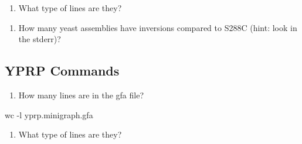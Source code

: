 \documentclass[
]{book}
\newenvironment{Shaded}{\begin{snugshade}}{\end{snugshade}}
\newcommand{\AttributeTok}[1]{\textcolor[rgb]{0.77,0.63,0.00}{#1}}
\newcommand{\FunctionTok}[1]{\textcolor[rgb]{0.00,0.00,0.00}{#1}}
\newcommand{\NormalTok}[1]{#1}
\providecommand{\tightlist}{%
  \setlength{\itemsep}{0pt}\setlength{\parskip}{0pt}}
\begin{document}
\begin{Shaded}
\begin{Highlighting}[]

\end{Highlighting}
\end{Shaded}

\begin{enumerate}
\def\labelenumi{\arabic{enumi}.}
\setcounter{enumi}{1}
\tightlist
\item
  What type of lines are they?
\end{enumerate}

\begin{Shaded}
\begin{Highlighting}[]

\end{Highlighting}
\end{Shaded}

\begin{enumerate}
\def\labelenumi{\arabic{enumi}.}
\setcounter{enumi}{2}
\tightlist
\item
  How many yeast assemblies have inversions compared to S288C (hint: look in the stderr)?
\end{enumerate}

\begin{Shaded}
\begin{Highlighting}[]

\end{Highlighting}
\end{Shaded}

\hypertarget{yprp-commands}{%
\subsection*{YPRP Commands}\label{yprp-commands}}

\begin{enumerate}
\def\labelenumi{\arabic{enumi}.}
\tightlist
\item
  How many lines are in the gfa file?
\end{enumerate}

\begin{Shaded}
\begin{Highlighting}[]
\FunctionTok{wc} \AttributeTok{{-}l}\NormalTok{ yprp.minigraph.gfa}
\end{Highlighting}
\end{Shaded}

\begin{enumerate}
\def\labelenumi{\arabic{enumi}.}
\setcounter{enumi}{1}
\tightlist
\item
  What type of lines are they?
\end{enumerate}
\end{document}
